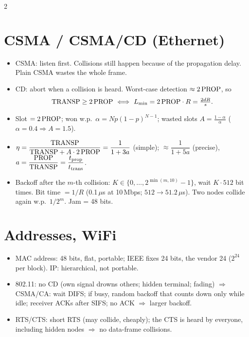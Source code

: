 \begin{multicols}{2}
\section{CSMA / CSMA/CD (Ethernet)}
\begin{itemize}
  \item CSMA: listen first. Collisions still happen because of the propagation delay. Plain CSMA wastes the whole frame.
  \item CD: abort when a collision is heard. Worst-case detection $\approx2\,\text{PROP}$, so
  \[ \TRANSP\ge2\,\PROP\ \Longleftrightarrow\ L_{\min}=2\,\PROP\cdot R=\tfrac{2dR}{s}. \]
  \item Slot $=2\,\text{PROP}$; won w.p.\ $\alpha=Np(1-p)^{N-1}$; wasted slots $A=\frac{1-\alpha}{\alpha}$ ($\alpha=0.4\Rightarrow A=1.5$).
  \item $\eta=\dfrac{\text{TRANSP}}{\text{TRANSP}+A\cdot2\,\text{PROP}}=\dfrac1{1+3a}$ (simple); $\approx\dfrac1{1+5a}$ (precise), $a=\dfrac{\text{PROP}}{\text{TRANSP}}=\dfrac{t_{\text{prop}}}{t_{\text{trans}}}$.
  \item Backoff after the $m$-th collision: $K\in\{0,\dots,2^{\min(m,10)}-1\}$, wait $K\cdot512$ bit times. Bit time $=1/R$ (0.1\,$\mu$s at 10\,Mbps; $512\to51.2\,\mu$s). Two nodes collide again w.p.\ $1/2^m$. Jam = 48 bits.
\end{itemize}

\section{Addresses, WiFi}
\begin{itemize}
  \item MAC address: 48 bits, flat, portable; IEEE fixes 24 bits, the vendor 24 ($2^{24}$ per block). IP: hierarchical, not portable.
  \item 802.11: no CD (own signal drowns others; hidden terminal; fading) $\Rightarrow$ CSMA/CA: wait DIFS; if busy, random backoff that counts down only while idle; receiver ACKs after SIFS; no ACK $\Rightarrow$ larger backoff.
  \item RTS/CTS: short RTS (may collide, cheaply); the CTS is heard by everyone, including hidden nodes $\Rightarrow$ no data-frame collisions.
\end{itemize}


\end{multicols}

